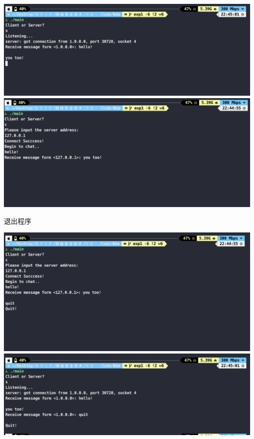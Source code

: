 \documentclass[UTF8,a4paper,10pt]{ctexart}
\begin{document}
\begin{center}
  \includegraphics[scale = 0.5]{5}
  \includegraphics[scale = 0.5]{6}
\end{center}
退出程序
\begin{center}
  \includegraphics[scale = 0.5]{7}
  \includegraphics[scale = 0.5]{8}
\end{center}
\end{document}
